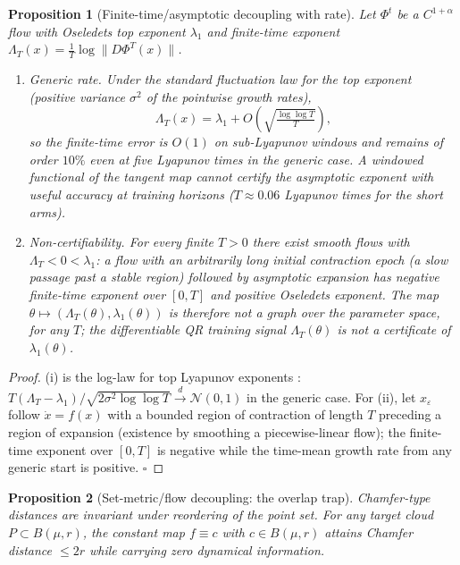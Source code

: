 \documentclass[journal]{IEEEtran}
\newtheorem{proposition}{Proposition}
\begin{document}
\begin{proposition}[Finite-time/asymptotic decoupling with rate]
\label{prop:finite}
Let $\Phi^t$ be a $C^{1+\alpha}$ flow with Oseledets top exponent
$\lambda_1$ and finite-time exponent
$\Lambda_T(x)=\frac{1}{T}\log\|D\Phi^T(x)\|$.
\begin{enumerate}
\item[(i)] \emph{Generic rate.} Under the standard fluctuation law for
the top exponent (positive variance $\sigma^2$ of the pointwise growth
rates),
\begin{equation}
  \Lambda_T(x)=\lambda_1+O\!\left(\sqrt{\tfrac{\log\log T}{T}}\right),
\end{equation}
so the finite-time error is $O(1)$ on sub-Lyapunov windows and remains
of order $10\%$ even at five Lyapunov times in the generic case. A
windowed functional of the tangent map cannot certify the asymptotic
exponent with useful accuracy at training horizons ($T\approx0.06$
Lyapunov times for the short arms).
\item[(ii)] \emph{Non-certifiability.} For every finite $T>0$ there
exist smooth flows with $\Lambda_T<0<\lambda_1$: a flow with an
arbitrarily long initial contraction epoch (a slow passage past a
stable region) followed by asymptotic expansion has negative
finite-time exponent over $[0,T]$ and positive Oseledets exponent. The
map $\theta\mapsto(\Lambda_T(\theta),\lambda_1(\theta))$ is therefore
not a graph over the parameter space, for any $T$; the differentiable
QR training signal $\Lambda_T(\theta)$ is not a certificate of
$\lambda_1(\theta)$.
\end{enumerate}
\end{proposition}

\begin{proof}
(i) is the log-law for top Lyapunov exponents
\cite{barreira2002lyapunov}: $T(\Lambda_T-\lambda_1)/\sqrt{2\sigma^2\log\log T}
\xrightarrow{d}\mathcal{N}(0,1)$ in the generic case. For (ii), let
$x_\varepsilon$ follow $\dot x=f(x)$ with a bounded region of
contraction of length $T$ preceding a region of expansion (existence by
smoothing a piecewise-linear flow); the finite-time exponent over
$[0,T]$ is negative while the time-mean growth rate from any generic
start is positive. $\square$
\end{proof}

\begin{proposition}[Set-metric/flow decoupling: the overlap trap]
\label{prop:overlap}
Chamfer-type distances are invariant under reordering of the point set.
For any target cloud $P\subset B(\mu,r)$, the constant map $f\equiv c$
with $c\in B(\mu,r)$ attains Chamfer distance $\le 2r$ while carrying
zero dynamical information.
\end{proposition}
\end{document}
